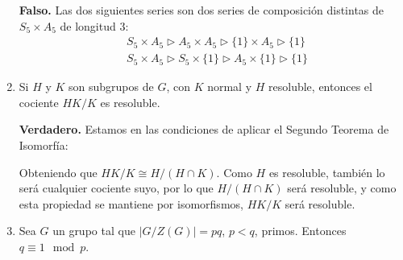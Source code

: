 \documentclass[12pt]{article}
\begin{document}
\begin{ejercicio}[5 puntos]
\begin{enumerate}
                \textbf{Falso.} Las dos siguientes series son dos series de composición distintas de $S_5\times A_5$ de longitud 3:
                \begin{align*}
                    &S_5\times A_5 \rhd A_5\times A_5 \rhd \{1\}\times A_5 \rhd \{1\} \\
                    &S_5\times A_5 \rhd S_5\times \{1\} \rhd A_5\times \{1\} \rhd \{1\}
                \end{align*}
            \item Si $H$ y $K$ son subgrupos de $G$, con $K$ normal y $H$ resoluble, entonces el cociente $HK/K$ es resoluble.

                \textbf{Verdadero.} Estamos en las condiciones de aplicar el Segundo Teorema de Isomorfía:
                \begin{figure}[H]
                    \centering
                \end{figure}
                Obteniendo que $HK/K \cong H/(H\cap K)$. Como $H$ es resoluble, también lo será cualquier cociente suyo, por lo que $H/(H\cap K)$ será resoluble, y como esta propiedad se mantiene por isomorfismos, $HK/K$ será resoluble.
            \item Sea $G$ un grupo tal que $|G/Z(G)| = pq$, $p<q$, primos. Entonces $q\equiv 1 \mod p$.


\end{enumerate}
\end{ejercicio}
\end{document}
